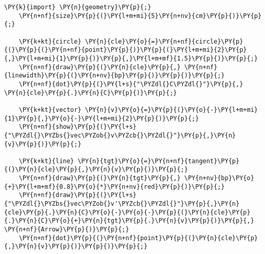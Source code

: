 \begin{Verbatim}[commandchars=\\\{\}]
    \PY{k}{import} \PY{n}{geometry}\PY{p}{;}
    \PY{n+nf}{size}\PY{p}{(}\PY{l+m+mi}{5}\PY{n+nv}{cm}\PY{p}{)}\PY{p}{;}

    \PY{k+kt}{circle} \PY{n}{cle}\PY{o}{=}\PY{n+nf}{circle}\PY{p}{(}\PY{p}{(}\PY{n+nf}{point}\PY{p}{)}\PY{p}{(}\PY{l+m+mi}{2}\PY{p}{,}\PY{l+m+mi}{1}\PY{p}{)}\PY{p}{,}\PY{l+m+mf}{1.5}\PY{p}{)}\PY{p}{;}
    \PY{n+nf}{draw}\PY{p}{(}\PY{n}{cle}\PY{p}{,} \PY{n+nf}{linewidth}\PY{p}{(}\PY{n+nv}{bp}\PY{p}{)}\PY{p}{)}\PY{p}{;}
    \PY{n+nf}{dot}\PY{p}{(}\PY{l+s}{"\PYZdl{}C\PYZdl{}"}\PY{p}{,} \PY{n}{cle}\PY{p}{.}\PY{n}{C}\PY{p}{)}\PY{p}{;}

    \PY{k+kt}{vector} \PY{n}{v}\PY{o}{=}\PY{p}{(}\PY{o}{-}\PY{l+m+mi}{1}\PY{p}{,}\PY{o}{-}\PY{l+m+mi}{2}\PY{p}{)}\PY{p}{;}
    \PY{n+nf}{show}\PY{p}{(}\PY{l+s}{"\PYZdl{}\PYZbs{}vec\PYZob{}v\PYZcb{}\PYZdl{}"}\PY{p}{,}\PY{n}{v}\PY{p}{)}\PY{p}{;}

    \PY{k+kt}{line} \PY{n}{tgt}\PY{o}{=}\PY{n+nf}{tangent}\PY{p}{(}\PY{n}{cle}\PY{p}{,}\PY{n}{v}\PY{p}{)}\PY{p}{;}
    \PY{n+nf}{draw}\PY{p}{(}\PY{n}{tgt}\PY{p}{,} \PY{n+nv}{bp}\PY{o}{+}\PY{l+m+mf}{0.8}\PY{o}{*}\PY{n+nv}{red}\PY{p}{)}\PY{p}{;}
    \PY{n+nf}{draw}\PY{p}{(}\PY{l+s}{"\PYZdl{}\PYZbs{}vec\PYZob{}v'\PYZcb{}\PYZdl{}"}\PY{p}{,}\PY{n}{cle}\PY{p}{.}\PY{n}{C}\PY{o}{-}\PY{o}{-}\PY{p}{(}\PY{n}{cle}\PY{p}{.}\PY{n}{C}\PY{o}{+}\PY{n}{tgt}\PY{p}{.}\PY{n}{v}\PY{p}{)}\PY{p}{,} \PY{n+nf}{Arrow}\PY{p}{)}\PY{p}{;}
    \PY{n+nf}{dot}\PY{p}{(}\PY{n+nf}{point}\PY{p}{(}\PY{n}{cle}\PY{p}{,}\PY{n}{v}\PY{p}{)}\PY{p}{)}\PY{p}{;}
\end{Verbatim}
